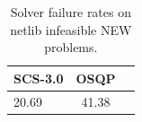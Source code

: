 \begin{table}
\centering
\caption{Solver failure rates on netlib infeasible NEW problems.}
\label{t-netlib infeasible NEW-failure}
\begin{tabular}{lcc}
\toprule
 SCS-3.0 &  OSQP \\
\midrule
   20.69 & 41.38 \\
\bottomrule
\end{tabular}
\end{table}
